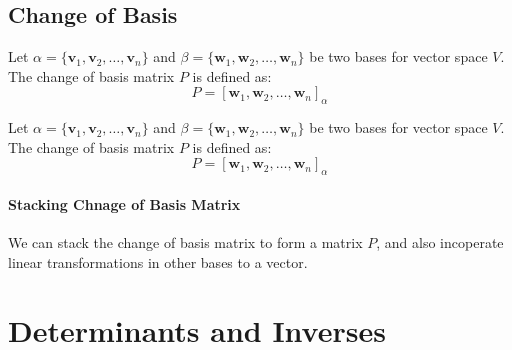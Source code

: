 \documentclass[11pt]{report}
\begin{document}
\subsection{Change of Basis}
\begin{definition}
    Let $\alpha = \{\textbf{v}_1, \textbf{v}_2, \ldots, \textbf{v}_n\}$ and $\beta = \{\textbf{w}_1, \textbf{w}_2, \ldots, \textbf{w}_n\}$ be two bases for vector space $V$. The change of basis matrix $P$ is defined as:
    \begin{equation}
        P = [\textbf{w}_1, \textbf{w}_2, \ldots, \textbf{w}_n]_\alpha
    \end{equation}
\end{definition}
\begin{theorem}
    Let $\alpha = \{\textbf{v}_1, \textbf{v}_2, \ldots, \textbf{v}_n\}$ and $\beta = \{\textbf{w}_1, \textbf{w}_2, \ldots, \textbf{w}_n\}$ be two bases for vector space $V$. The change of basis matrix $P$ is defined as:
    \begin{equation}
        P = [\textbf{w}_1, \textbf{w}_2, \ldots, \textbf{w}_n]_\alpha
    \end{equation}
\end{theorem}
\paragraph{Stacking Chnage of Basis Matrix} We can stack the change of basis matrix to form a matrix $P$, and also incoperate linear transformations in other bases to a vector.
\section{Determinants and Inverses}
\end{document}
